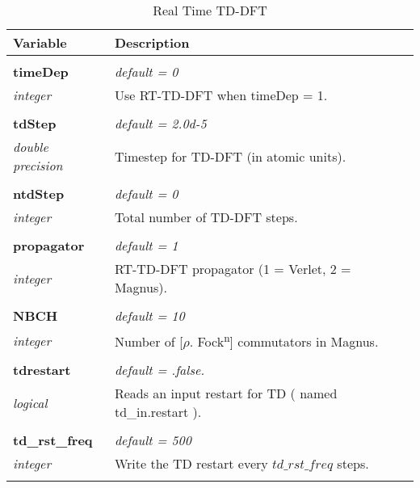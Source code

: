 \begin{Spacing}{1.0}
\begin{longtable}{ p{} p{} }

   \toprule
   \textbf{Variable} & Description \\*
   \midrule \\*
   \endhead

   \bottomrule
   \caption{Real Time TD-DFT}
   \endfoot

   \textbf{timeDep}
   &  \textit{default = 0}
   \\*\textit{integer}
   & Use RT-TD-DFT when timeDep = 1.\\* \\

   \textbf{tdStep}
   &  \textit{default = 2.0d-5}
   \\*\textit{double precision}
   & Timestep for TD-DFT (in atomic units).\\* \\

   \textbf{ntdStep}
   &  \textit{default = 0}
   \\*\textit{integer}
   & Total number of TD-DFT steps.\\* \\

   \textbf{propagator}
   &  \textit{default = 1}
   \\*\textit{integer}
   & RT-TD-DFT propagator (1 = Verlet, 2 = Magnus).\\* \\

   \textbf{NBCH}
   &  \textit{default = 10}
   \\*\textit{integer}
   & Number of [$\rho$. Fock\textsuperscript{n}] commutators
   in Magnus.\\* \\

   \textbf{tdrestart}
   &  \textit{default = .false. }
   \\*\textit{logical}
   & Reads an input restart for TD ( named td\_in.restart ).\\* \\

   \textbf{td\_rst\_freq}
   &  \textit{default = 500}
   \\*\textit{integer}
   & Write the TD restart every $td\_rst\_freq$ steps.\\* \\


\end{longtable}
\end{Spacing}
